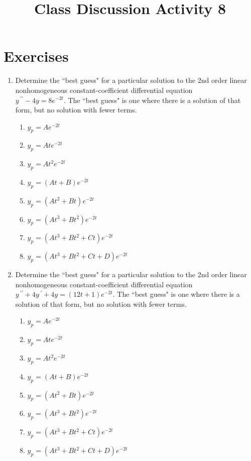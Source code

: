 \documentclass{ximera}
\begin{document}
\begin{abstract}
 \end{abstract}

    \title{Class Discussion Activity 8}
    
    \maketitle

\section*{Exercises}



\begin{enumerate}[label=(\arabic*)]

\item Determine the ``best guess" for a particular solution to the 2nd order linear nonhomogeneous constant-coefficient differential equation \\$y\,^{\prime\prime}-4y=8e^{-2t}$.  The ``best guess" is one where there is a solution of that form, but no solution with fewer terms.
    


\begin{enumerate}[label=(\alph*)]
\item $y_p=Ae^{-2t}$
\item $y_p=Ate^{-2t}$ %
\item $y_p=At^2 e^{-2t}$
\item $y_p=(At+B)e^{-2t}$
\item $y_p=(At^2+Bt)e^{-2t}$  
\item $y_p=(At^3+Bt^2)e^{-2t}$  
\item $y_p=(At^3+Bt^2+Ct)e^{-2t}$  
\item $y_p=(At^3+Bt^2+Ct+D)e^{-2t}$  
\end{enumerate}


\item Determine the ``best guess" for a particular solution to the 2nd order linear nonhomogeneous constant-coefficient differential equation \\$y\,^{\prime\prime}+4y\,^{\prime}+4y=(12t+1)e^{-2t}$.  The ``best guess" is one where there is a solution of that form, but no solution with fewer terms.

\begin{enumerate}[label=(\alph*)]
\item $y_p=Ae^{-2t}$
\item $y_p=Ate^{-2t}$ 
\item $y_p=At^2 e^{-2t}$
\item $y_p=(At+B)e^{-2t}$
\item $y_p=(At^2+Bt)e^{-2t}$  
\item $y_p=(At^3+Bt^2)e^{-2t}$  %
\item $y_p=(At^3+Bt^2+Ct)e^{-2t}$  
\item $y_p=(At^3+Bt^2+Ct+D)e^{-2t}$  
\end{enumerate}


\end{enumerate}
\end{document}
